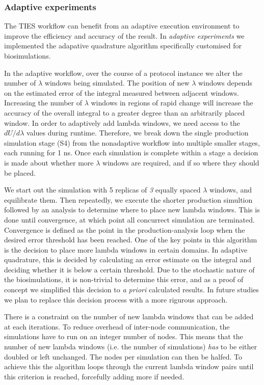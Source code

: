 
\subsubsection{Adaptive experiments}

The TIES workflow can benefit from an adaptive execution environment to improve
the efficiency and accuracy of the result. In \emph{adaptive experiments} we
implemented the adapative quadrature algorithm specifically customised for
biosimulations.

In the adaptive workflow, over the course of a protocol instance we alter
the number of $\lambda$ windows being simulated. The position of new $\lambda$
windows depends on the estimated error of the integral measured between
adjacent windows. Increasing the number of $\lambda$ windows in regions of
rapid change will increase the accuracy of the overall integral to a greater
degree than an
arbitrarily placed window. In order to adaptively add lambda windows, we need
access to the $dU/d\lambda$ values during runtime. Therefore, we break down the
single production simulation stage (S4) from the nonadaptive workflow into
multiple smaller stages, each running for 1 ns. Once each simulation is
complete within a stage a decision is made about whether more $\lambda$ windows
are required, and if so where they should be placed.

We start out the simulation with 5 replicas of \emph{3} equally spaced
$\lambda$ windows, and equilibrate them. Then repeatedly, we execute the
shorter production simultion followed by an analysis to determine where to
place new lambda windows. This is done until convergence, at which point all
concurrect simulation are terminated. Convergence is defined as the point in
the production-analysis loop when the desired error threshold has been
reached.  One of the key points in this algorithm is the decision to place more
lambda windows in certain domains. In adaptive quadrature, this is decided by
calculating an error estimate on the integral and deciding whether it is below
a certain threshold. Due to the stochastic nature of the biosimulations, it is
non-trivial to determine this error, and as a proof of concept we simplified
this decision to {\it a priori} calculated results. In future studies we plan
to replace this decision process with a more rigurous approach.

There is a constraint on the number of new lambda windows that can be added at
each iterations. To reduce overhead of inter-node communication, the
simulations have to run on an integer number of nodes. This means that the
number of new lambda windows (i.e. the number of simulations) \emph{has} to be
either doubled or left unchanged. The nodes per simulation can then be halfed.
To achieve this the algorithm loops through the current lambda window pairs
until this criterion is reached, forcefully adding more if needed.


